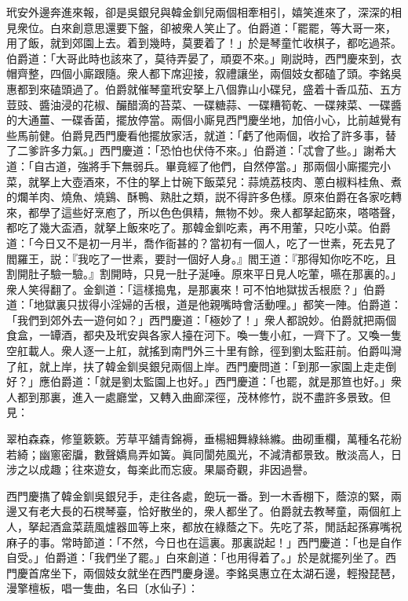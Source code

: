 玳安外邊奔進來報，卻是吳銀兒與韓金釧兒兩個相牽相引，嬉笑進來了，深深的相見衆位。白來創意思還要下盤，卻被衆人笑止了。伯爵道：「罷罷，等大哥一來，用了飯，就到郊園上去。着到幾時，莫要着了！」於是琴童忙收棋子，都吃過茶。伯爵道：「大哥此時也該來了，莫待弄晏了，頑耍不來。」剛説時，西門慶來到，衣帽齊整，四個小廝跟隨。衆人都下席迎接，叙禮讓坐，兩個妓女都磕了頭。李銘吳惠都到來磕頭過了。伯爵就催琴童玳安拏上八個靠山小碟兒，盛着十香瓜茄、五方荳豉、醬油浸的花椒、釅醋滴的苔菜、一碟糖蒜、一碟糟筍乾、一碟辣菜、一碟醬的大通薑、一碟香菌，擺放停當。兩個小廝見西門慶坐地，加倍小心，比前越覺有些馬前健。伯爵見西門慶看他擺放家活，就道：「虧了他兩個，收拾了許多事，替了二爹許多力氣。」西門慶道：「恐怕也伏侍不來。」伯爵道：「忒會了些。」謝希大道：「自古道，強將手下無弱兵。畢竟經了他們，自然停當。」那兩個小廝擺完小菜，就拏上大壺酒來，不住的拏上廿碗下飯菜兒：蒜燒荔枝肉、蔥白椒料桂魚、煮的爛羊肉、燒魚、燒鷄、酥鴨、熟肚之類，説不得許多色樣。原來伯爵在各家吃轉來，都學了這些好烹庖了，所以色色俱精，無物不妙。衆人都拏起筯來，嗒嗒聲，都吃了幾大盃酒，就拏上飯來吃了。那韓金釧吃素，再不用葷，只吃小菜。伯爵道：「今日又不是初一月半，喬作衙甚的？當初有一個人，吃了一世素，死去見了閻羅王，説：『我吃了一世素，要討一個好人身。』閻王道：『那得知你吃不吃，且割開肚子驗一驗。』割開時，只見一肚子涎唾。原來平日見人吃葷，嚥在那裏的。」衆人笑得翻了。金釧道：「這樣搗鬼，是那裏來！可不怕地獄拔舌根麽？」伯爵道：「地獄裏只拔得小淫婦的舌根，道是他親嘴時會活動哩。」都笑一陣。伯爵道：「我們到郊外去一遊何如？」西門慶道：「極妙了！」衆人都說妙。伯爵就把兩個食盒，一罈酒，都央及玳安與各家人擡在河下。喚一隻小舡，一齊下了。又喚一隻空舡載人。衆人逐一上舡，就搖到南門外三十里有餘，徑到劉太監莊前。伯爵叫灣了舡，就上岸，扶了韓金釧吳銀兒兩個上岸。西門慶問道：「到那一家園上走走倒好？」應伯爵道：「就是劉太監園上也好。」西門慶道：「也罷，就是那笪也好。」衆人都到那裏，進入一處廳堂，又轉入曲廊深徑，茂林修竹，説不盡許多景致。但見：

\begin{myquote}
翠柏森森，修篁簌簌。芳草平舖青錦褥，垂楊細舞綠絲縧。曲砌重欄，萬種名花紛若綺；幽窻密牖，數聲嬌鳥弄如簧。眞同閬苑風光，不減清都景致。散淡高人，日涉之以成趣；往來遊女，每楽此而忘疲。果屬奇觀，非因過譽。
\end{myquote}

西門慶㩦了韓金釧吳銀兒手，走往各處，飽玩一番。到一木香棚下，蔭涼的緊，兩邊又有老大長的石櫈琴臺，恰好散坐的，衆人都坐了。伯爵就去教琴童，兩個舡上人，拏起酒盒菜蔬風爐器皿等上來，都放在綠蔭之下。先吃了茶，閒話起孫寡嘴祝麻子的事。常時節道：「不然，今日也在這裏。那裏説起！」西門慶道：「也是自作自受。」伯爵道：「我們坐了罷。」白來創道：「也用得着了。」於是就擺列坐了。西門慶首席坐下，兩個妓女就坐在西門慶身邊。李銘吳惠立在太湖石邊，輕撥琵琶，漫擎檀板，唱一隻曲，名曰〔水仙子〕：

